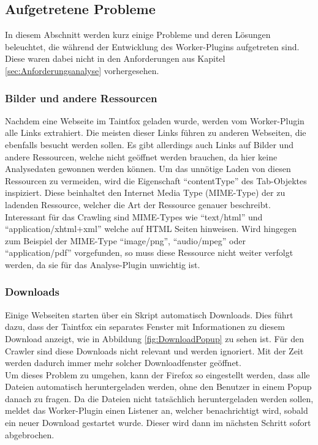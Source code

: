 \subsection{Aufgetretene Probleme}
In diesem Abschnitt werden kurz einige Probleme und deren Lösungen beleuchtet, die während der Entwicklung des Worker-Plugins aufgetreten sind. Diese waren dabei nicht in den Anforderungen aus Kapitel \ref{sec:Anforderungsanalyse} vorhergesehen.
\subsubsection{Bilder und andere Ressourcen}
Nachdem eine Webseite im Taintfox geladen wurde, werden vom Worker-Plugin alle Links extrahiert. Die meisten dieser Links führen zu anderen Webseiten, die ebenfalls besucht werden sollen. Es gibt allerdings auch Links auf Bilder und andere Ressourcen, welche nicht geöffnet werden brauchen, da hier keine Analysedaten gewonnen werden können. Um das unnötige Laden von diesen Ressourcen zu vermeiden, wird die Eigenschaft \enquote{contentType} des Tab-Objektes inspiziert. Diese beinhaltet den Internet Media Type (MIME-Type) der zu ladenden Ressource, welcher die Art der Ressource genauer beschreibt. Interessant für das Crawling sind MIME-Types wie \enquote{text/html} und \enquote{application/xhtml+xml} welche auf HTML Seiten hinweisen. Wird hingegen zum Beispiel der MIME-Type \enquote{image/png}, \enquote{audio/mpeg} oder \enquote{application/pdf} vorgefunden, so muss diese Ressource nicht weiter verfolgt werden, da sie für das Analyse-Plugin unwichtig ist. 
\subsubsection{Downloads}
Einige Webseiten starten über ein Skript automatisch Downloads. Dies führt dazu, dass der Taintfox ein separates Fenster mit Informationen zu diesem Download anzeigt, wie in Abbildung \ref{fig:DownloadPopup} zu sehen ist. Für den Crawler sind diese Downloads nicht relevant und werden ignoriert. Mit der Zeit werden dadurch immer mehr solcher Downloadfenster geöffnet. \\
Um dieses Problem zu umgehen, kann der Firefox so eingestellt werden, dass alle Dateien automatisch heruntergeladen werden, ohne den Benutzer in einem Popup danach zu fragen. Da die Dateien nicht tatsächlich heruntergeladen werden sollen, meldet das Worker-Plugin einen Listener an, welcher benachrichtigt wird, sobald ein neuer Download gestartet wurde. Dieser wird dann im nächsten Schritt sofort abgebrochen.

